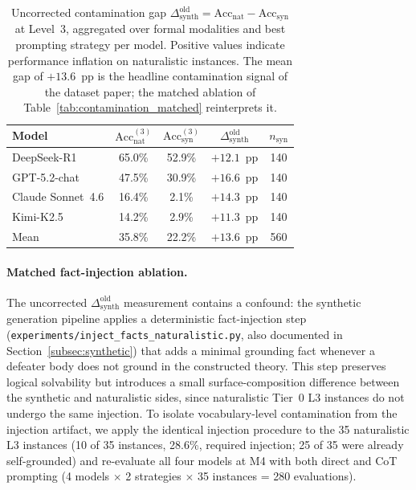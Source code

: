 \documentclass{article}
\theoremstyle{definition}
\begin{document}
\begin{table}[h]
\centering
\caption{Uncorrected contamination gap $\Delta_{\mathrm{synth}}^{\mathrm{old}} = \mathrm{Acc}_{\mathrm{nat}} - \mathrm{Acc}_{\mathrm{syn}}$ at Level~3, aggregated over formal modalities and best prompting strategy per model. Positive values indicate performance inflation on naturalistic instances. The mean gap of $+13.6$~pp is the headline contamination signal of the dataset paper; the matched ablation of Table~\ref{tab:contamination_matched} reinterprets it.}
\label{tab:contamination}
\small
\begin{tabular}{@{}lcccc@{}}
\toprule
\textbf{Model} & $\mathrm{Acc}_{\mathrm{nat}}^{(3)}$ & $\mathrm{Acc}_{\mathrm{syn}}^{(3)}$ & $\Delta_{\mathrm{synth}}^{\mathrm{old}}$ & $n_{\mathrm{syn}}$ \\
\midrule
DeepSeek-R1       & 65.0\% & 52.9\% & $+12.1$~pp & 140 \\
GPT-5.2-chat      & 47.5\% & 30.9\% & $+16.6$~pp & 140 \\
Claude Sonnet~4.6 & 16.4\% & \phantom{0}2.1\% & $+14.3$~pp & 140 \\
Kimi-K2.5         & 14.2\% & \phantom{0}2.9\% & $+11.3$~pp & 140 \\
\midrule
Mean              & 35.8\% & 22.2\% & $+13.6$~pp & 560 \\
\bottomrule
\end{tabular}
\end{table}

\paragraph{Matched fact-injection ablation.}\label{para:matched_factinj}
The uncorrected $\Delta_{\mathrm{synth}}^{\mathrm{old}}$ measurement contains a confound: the synthetic generation pipeline applies a deterministic fact-injection step (\texttt{experiments/inject\_facts\_naturalistic.py}, also documented in Section~\ref{subsec:synthetic}) that adds a minimal grounding fact whenever a defeater body does not ground in the constructed theory. This step preserves logical solvability but introduces a small surface-composition difference between the synthetic and naturalistic sides, since naturalistic Tier~0 L3 instances do not undergo the same injection. To isolate vocabulary-level contamination from the injection artifact, we apply the identical injection procedure to the 35 naturalistic L3 instances (10 of 35 instances, 28.6\%, required injection; 25 of 35 were already self-grounded) and re-evaluate all four models at M4 with both direct and CoT prompting (4 models $\times$ 2 strategies $\times$ 35 instances = 280 evaluations).
\end{document}
